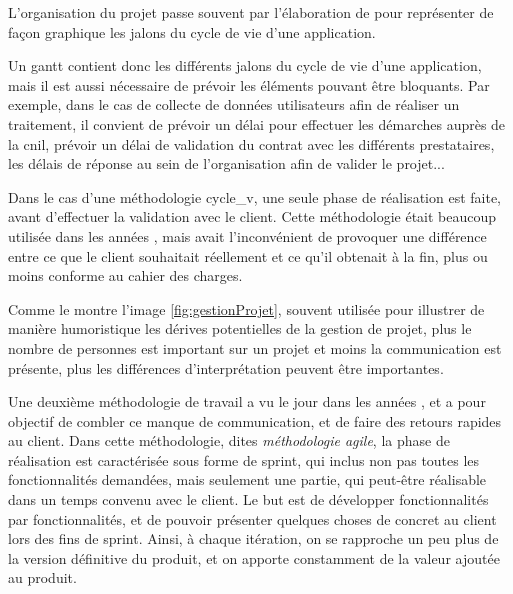 
L'organisation du projet passe souvent par l'élaboration de  pour représenter de façon graphique les jalons du cycle de vie d'une application.


Un \gls{gantt} contient donc les différents jalons du cycle de vie d'une application, mais il est aussi nécessaire de prévoir les éléments pouvant être bloquants. Par exemple, dans le cas de collecte de données utilisateurs afin de réaliser un traitement, il convient de prévoir un délai pour effectuer les démarches auprès de la \gls{cnil}, prévoir un délai de validation du contrat avec les différents prestataires, les délais de réponse au sein de l'organisation afin de valider le projet...

Dans le cas d'une méthodologie \gls{cycle_v}, une seule phase de réalisation est faite, avant d'effectuer la validation avec le client. Cette méthodologie était beaucoup utilisée dans les années , mais avait l'inconvénient de provoquer une différence entre ce que le client souhaitait réellement et ce qu'il obtenait à la fin, plus ou moins conforme au cahier des charges. 


Comme le montre l'image \ref{fig:gestionProjet}, souvent utilisée pour illustrer de manière humoristique les dérives potentielles de la gestion de projet, plus le nombre de personnes est important sur un projet et moins la communication est présente, plus les différences d'interprétation peuvent être importantes. 

Une deuxième méthodologie de travail a vu le jour dans les années , et a pour objectif de combler ce manque de communication, et de faire des retours rapides au client. Dans cette méthodologie, dites \emph{méthodologie agile}, la phase de réalisation est caractérisée sous forme de sprint, qui inclus non pas toutes les fonctionnalités demandées, mais seulement une partie, qui peut-être réalisable dans un temps convenu avec le client. Le but est de développer fonctionnalités par fonctionnalités, et de pouvoir présenter quelques choses de concret au client lors des fins de sprint. Ainsi, à chaque itération, on se rapproche un peu plus de la version définitive du produit, et on apporte constamment de la valeur ajoutée au produit.

